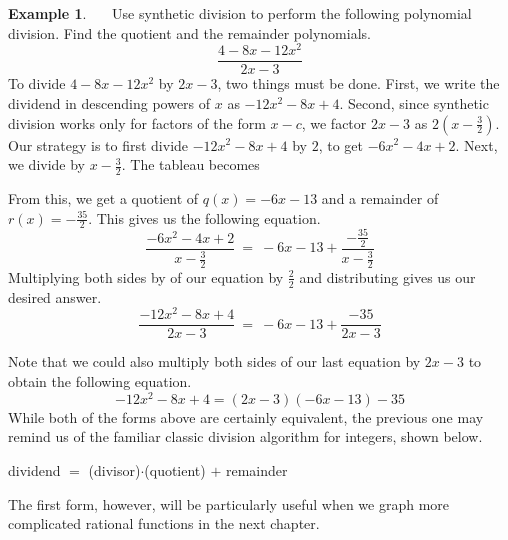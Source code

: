 \documentclass[12pt]{book}
\theoremstyle{definition}
\newtheorem{example}{Example}
\begin{document}
\begin{example}~~~Use synthetic division to perform the following polynomial division.  Find the quotient and the remainder polynomials.
$$\dfrac{4-8x-12x^2}{2x-3}$$
To divide $4-8x-12x^2$ by $2x-3$, two things must be done.  First, we write the dividend in descending powers of $x$ as $-12x^2-8x+4$.  Second, since synthetic division works only for factors of the form $x-c$, we factor $2x-3$ as $2\left(x-\frac{3}{2}\right)$.  Our strategy is to first divide $-12x^2-8x+4$ by $2$, to get $-6x^2-4x+2$.  Next, we divide by $x-\frac{3}{2}$.  The tableau becomes
\begin{center}
\end{center}
From this, we get a quotient of $q(x)=-6 x - 13$ and a remainder of
$r(x)=-\frac{35}{2}$.  This gives us the following equation.
$$\frac{-6x^2-4x+2}{x-\frac{3}{2}}~=~-6 x - 13 + \frac{-\frac{35}{2}}{x-\frac{3}{2}}$$
Multiplying both sides by of our equation by $\frac{2}{2}$ and distributing gives us our desired answer.
$$\frac{-12x^2-8x+4}{2x-3}~=~-6 x - 13 + \frac{-35}{2x-3}$$
\end{example}
Note that we could also multiply both sides of our last equation by $2x-3$ to obtain the following equation.
$$-12x^2-8x+4 = \left(2x-3\right) (-6 x - 13) - 35$$
While both of the forms above are certainly equivalent, the previous one may remind us of the familiar classic division algorithm for integers, shown below.
\begin{center}
dividend $=$ (divisor)$\cdot$(quotient) $+$ remainder
\end{center}
The first form, however, will be particularly useful when we graph more complicated rational functions in the next chapter.
\newpage
\end{document}
